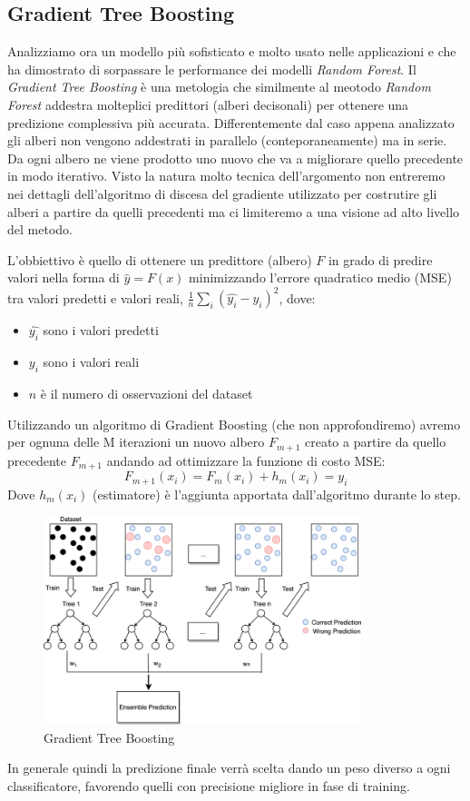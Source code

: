 \documentclass[12pt,a4paper,openright,twoside]{report}
\begin{document}
\subsection{Gradient Tree Boosting }
Analizziamo ora un modello più sofisticato e molto usato nelle applicazioni e che ha dimostrato di sorpassare le performance dei modelli \emph{Random Forest}.
Il \emph{Gradient Tree Boosting} è una metologia che similmente al meotodo \emph{Random Forest} addestra molteplici predittori (alberi decisonali) per ottenere una predizione complessiva più accurata. Differentemente dal caso appena analizzato gli alberi non vengono addestrati in parallelo (conteporaneamente) ma in serie. Da ogni albero ne viene prodotto uno nuovo che va a migliorare quello precedente in modo iterativo. Visto la natura molto tecnica dell'argomento non entreremo nei dettagli dell'algoritmo di discesa del gradiente utilizzato per costrutire gli alberi a partire da quelli precedenti ma ci limiteremo a una visione ad alto livello del metodo. 

L'obbiettivo è quello di ottenere un predittore (albero) $F$ in grado di predire valori nella forma di $\hat{y} = F(x)$ minimizzando l'errore quadratico medio (MSE) tra valori predetti e valori reali, $\frac{1}{n}\sum_{i} (\hat{y_{i}} - y_{i})^2$, dove: 
\begin{itemize}
    \item $\hat{y_{i}}$ sono i valori predetti 
    \item $y_{i}$ sono i valori reali 
    \item $n$ è il numero di osservazioni del dataset 
\end{itemize}
Utilizzando un algoritmo di Gradient Boosting (che non approfondiremo) avremo per ognuna delle M iterazioni
un nuovo albero $F_{m+1}$ creato a partire da quello precedente $F_{m+1}$ andando ad ottimizzare la funzione di costo MSE: 
\begin{equation}
    F_{m+1}(x_{i}) = F_{m}(x_{i}) + h_{m}(x_{i}) = y_{i}
\end{equation}
Dove $h_{m}(x_{i})$ (estimatore) è l'aggiunta apportata dall'algoritmo durante lo step.
\begin{center}
\begin{figure}[h]
\centering
\includegraphics[width=350px,keepaspectratio]{gradient tree boosting.png}
\caption{Gradient Tree Boosting   }
\end{figure}    
\end{center}
In generale quindi la predizione finale verrà scelta dando un peso diverso a ogni classificatore, favorendo quelli con precisione migliore in fase di training. 
\end{document}
